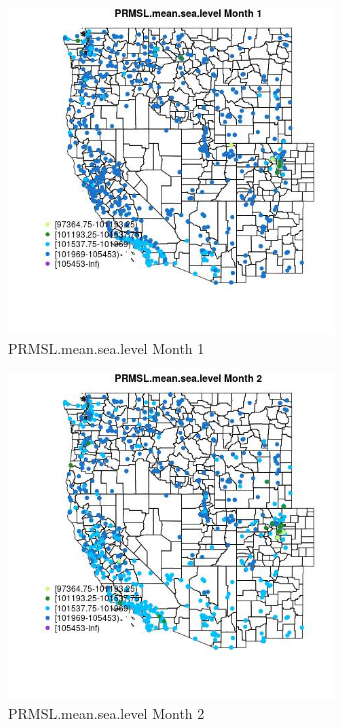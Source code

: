 \begin{figure} 
\centering  
\includegraphics[width=0.77\textwidth]{Code_Outputs/Report_ML_input_PM25_Step4_part_f_de_duplicated_aves_prioritize_24hr_obswNAs_MapObsMo1PRMSLmeansealevel.jpg} 
\caption{\label{fig:Report_ML_input_PM25_Step4_part_f_de_duplicated_aves_prioritize_24hr_obswNAsMapObsMo1PRMSLmeansealevel}PRMSL.mean.sea.level Month 1} 
\end{figure} 
 

\clearpage 

\begin{figure} 
\centering  
\includegraphics[width=0.77\textwidth]{Code_Outputs/Report_ML_input_PM25_Step4_part_f_de_duplicated_aves_prioritize_24hr_obswNAs_MapObsMo2PRMSLmeansealevel.jpg} 
\caption{\label{fig:Report_ML_input_PM25_Step4_part_f_de_duplicated_aves_prioritize_24hr_obswNAsMapObsMo2PRMSLmeansealevel}PRMSL.mean.sea.level Month 2} 
\end{figure} 
 

